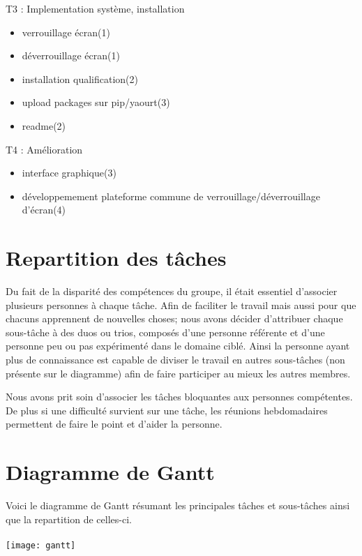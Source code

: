 T3 : Implementation système, installation
\begin{itemize}
  \item{verrouillage écran(1)}
  \item{déverrouillage écran(1)}
  \item{installation qualification(2)}
  \item{upload packages sur pip/yaourt(3)}
  \item{readme(2)}
\end{itemize}

T4 : Amélioration
\begin{itemize}
  \item{interface graphique(3)}
  \item{développemement plateforme commune de verrouillage/déverrouillage
        d’écran(4)}
\end{itemize}

\section{Repartition des tâches}

Du fait de la disparité des compétences du groupe, il était essentiel
d'associer plusieurs personnes à chaque tâche. Afin de faciliter le travail
mais aussi pour que chacuns apprennent de nouvelles choses; nous avons
décider d'attribuer chaque sous-tâche à des duos ou trios, composés d'une
personne référente et d'une personne peu ou pas expérimenté dans le domaine
ciblé. Ainsi la personne ayant plus de connaissance est capable de diviser
le travail en autres sous-tâches (non présente sur le diagramme) afin de faire
participer au mieux les autres membres.

Nous avons prit soin d'associer les tâches bloquantes aux personnes
compétentes. De plus si une difficulté survient sur une tâche,
les réunions hebdomadaires permettent de faire le point et d'aider la
personne.

\section{Diagramme de Gantt}
Voici le diagramme de Gantt résumant les principales tâches et sous-tâches
ainsi que la repartition de celles-ci.
\\
\\
\texttt{[image: gantt]}
